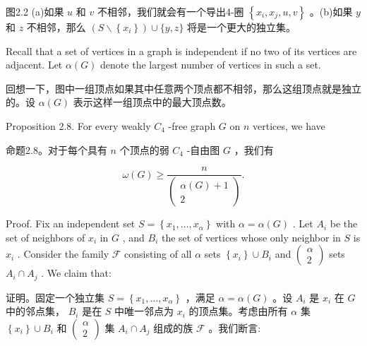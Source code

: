 \documentclass[10pt]{article}
\begin{document}
\begin{tcolorbox}\relax
图2.2 (a)如果 \(u\) 和 \(v\) 不相邻，我们就会有一个导出4-圈 \(\left\{  {{x}_{i},{x}_{j},u,v}\right\}\) 。(b)如果 \(y\) 和 \(z\) 不相邻，那么 \(\left( {S \smallsetminus  \left\{  {x}_{i}\right\}  }\right)  \cup  \{ y,z\}\) 将是一个更大的独立集。
\end{tcolorbox}

Recall that a set of vertices in a graph is independent if no two of its vertices are adjacent. Let \(\alpha \left( G\right)\) denote the largest number of vertices in such a set.

\begin{tcolorbox}\relax
回想一下，图中一组顶点如果其中任意两个顶点都不相邻，那么这组顶点就是独立的。设 \(\alpha \left( G\right)\) 表示这样一组顶点中的最大顶点数。
\end{tcolorbox}

Proposition 2.8. For every weakly \({C}_{4}\) -free graph \(G\) on \(n\) vertices, we have

\begin{tcolorbox}\relax
命题2.8。对于每个具有 \(n\) 个顶点的弱 \({C}_{4}\) -自由图 \(G\) ，我们有
\end{tcolorbox}

\[
\omega \left( G\right)  \geq  \frac{n}{\left( \begin{matrix} \alpha \left( G\right)  + 1 \\  2 \end{matrix}\right) }.
\]

Proof. Fix an independent set \(S = \left\{  {{x}_{1},\ldots ,{x}_{\alpha }}\right\}\) with \(\alpha  = \alpha \left( G\right)\) . Let \({A}_{i}\) be the set of neighbors of \({x}_{i}\) in \(G\) , and \({B}_{i}\) the set of vertices whose only neighbor in \(S\) is \({x}_{i}\) . Consider the family \(\mathcal{F}\) consisting of all \(\alpha\) sets \(\left\{  {x}_{i}\right\}   \cup  {B}_{i}\) and \(\left( \begin{array}{l} \alpha \\  2 \end{array}\right)\) sets \({A}_{i} \cap  {A}_{j}\) . We claim that:

\begin{tcolorbox}\relax
证明。固定一个独立集 \(S = \left\{  {{x}_{1},\ldots ,{x}_{\alpha }}\right\}\) ，满足 \(\alpha  = \alpha \left( G\right)\) 。设 \({A}_{i}\) 是 \({x}_{i}\) 在 \(G\) 中的邻点集， \({B}_{i}\) 是在 \(S\) 中唯一邻点为 \({x}_{i}\) 的顶点集。考虑由所有 \(\alpha\) 集 \(\left\{  {x}_{i}\right\}   \cup  {B}_{i}\) 和 \(\left( \begin{array}{l} \alpha \\  2 \end{array}\right)\) 集 \({A}_{i} \cap  {A}_{j}\) 组成的族 \(\mathcal{F}\) 。我们断言:
\end{tcolorbox}
\end{document}
